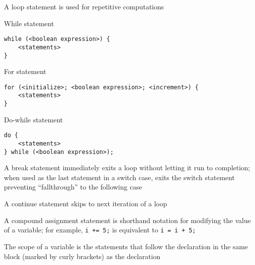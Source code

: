 \documentclass[8pt,a4paper,compress]{beamer}
\begin{document}
\begin{frame}[fragile]
\pause

A loop statement is used for repetitive computations

\pause
\bigskip

While statement
\begin{lstlisting}[language={}]
while (<boolean expression>) {
    <statements>
}
\end{lstlisting}

\pause
\bigskip

For statement
\begin{lstlisting}[language={}]
for (<initialize>; <boolean expression>; <increment>) {
    <statements>
}
\end{lstlisting}

\pause
\bigskip

Do-while statement
\begin{lstlisting}[language={}]
do {
    <statements>
} while (<boolean expression>);
\end{lstlisting}

\pause
\bigskip

A break statement immediately exits a loop without letting it run to completion; when used as the last statement in a switch case, exits the switch statement preventing ``fallthrough'' to the following case

\pause
\bigskip

A continue statement skips to next iteration of a loop
\end{frame}

\begin{frame}[fragile]
\pause

A compound assignment statement is shorthand notation for modifying the value of a variable; for example, \lstinline{i += 5;} is equivalent to \lstinline{i = i + 5;}

\pause
\bigskip

The scope of a variable is the statements that follow the declaration in the same block (marked by curly brackets) as the declaration
\end{frame}
\end{document}
